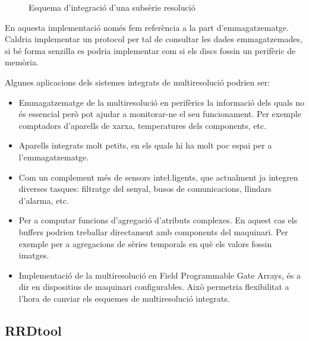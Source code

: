 \begin{figure}[htp]
\centering

\caption{Esquema d'integració d'una subsèrie resolució}
\label{fig:vhdl:resolucio}
\end{figure}

En aquesta implementació només fem referència a la part
d'emmagatzematge.  Caldria implementar un protocol per tal de
consultar les dades emmagatzemades, si bé forma senzilla es podria
implementar com si els discs fossin un perifèric de memòria.  




Algunes aplicacions dels sistemes integrats de multiresolució podrien ser:

\begin{itemize}
\item Emmagatzematge de la multiresolució en perifèrics la informació
  dels quals no és essencial però pot ajudar a monitorar-ne el seu
  funcionament. Per exemple comptadors d'aparells de xarxa,
  temperatures dels components, etc.

\item Aparells integrats molt petits, en els quals hi ha molt poc
  espai per a l'emmagatzematge. %

\item Com un complement més de sensors inte\l.ligents, que actualment
  ja integren diverses tasques: filtratge del senyal, busos de
  comunicacions, llindars d'alarma, etc.


\item Per a computar funcions d'agregació d'atributs complexes. En
  aquest cas els buffers podrien treballar directament amb components
  del maquinari. Per exemple per a agregacions de sèries temporals en
  què els valors fossin imatges.

\item Implementació de la multiresolució en Field Programmable Gate
  Arrays, és a dir en dispositius de maquinari configurables. Això
  permetria flexibilitat a l'hora de canviar els esquemes de
  multiresolució integrats.



\end{itemize}





\subsection{RRDtool}

